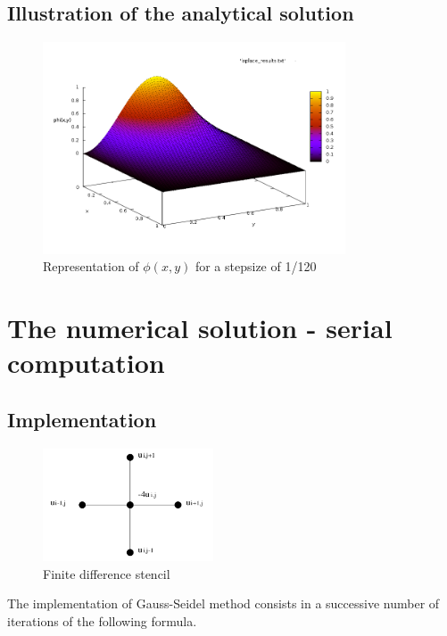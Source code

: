 \documentclass[a4paper,11pt]{article}
\begin{document}
\subsection{Illustration of the analytical solution}

\begin{figure}[h!]
  \centering
  \includegraphics[width=0.8\textwidth]{images/analytical.png}
  \caption{Representation of $\phi(x,y)$ for a stepsize of 1/120}
\end{figure}

\section{The numerical solution - serial computation}
\subsection{Implementation}

\begin{figure}
  \hspace{2em}
  \vspace{1em}
  \caption{Finite difference stencil}
  \includegraphics[width=0.45\textwidth]{images/gauss-seidel.png}
\end{figure}

The implementation of Gauss-Seidel method consists in a successive number of iterations of the following formula.
\end{document}
